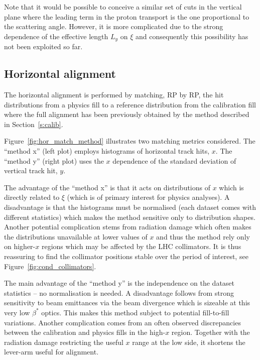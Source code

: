 \documentclass[TOTEM]{cern/cernphprep}
\begin{document}
Note that it would be possible to conceive a similar set of cuts in the vertical plane where the leading term in the proton transport is the one proportional to the scattering angle. However, it is more complicated due to the strong dependence of the effective length $L_y$ on $\xi$ and consequently this possibility has not been exploited so far.

\subsection{Horizontal alignment}
\label{s:phys-horizontal}

The horizontal alignment is performed by matching, RP by RP, the hit distributions from a physics fill to a reference distribution from the calibration fill where the full alignment has been previously obtained by the method described in Section~\ref{s:calib}.

Figure~\ref{fig:hor_match_method} illustrates two matching metrics considered. The ``method x'' (left plot) employs histograms of horizontal track hits, $x$. The ``method y'' (right plot) uses the $x$ dependence of the standard deviation of vertical track hit, $y$.

The advantage of the ``method x'' is that it acts on distributions of $x$ which is directly related to $\xi$ (which is of primary interest for physics analyses). A disadvantage is that the histograms must be normalised (each dataset comes with different statistics) which makes the method sensitive only to distribution shapes. Another potential complication stems from radiation damage which often makes the distributions unavailable at lower values of $x$ and thus the method rely only on higher-$x$ regions which may be affected by the LHC collimators. It is thus reassuring to find the collimator positions stable over the period of interest, see Figure~\ref{fig:cond_collimators}.

The main advantage of the ``method y'' is the independence on the dataset statistics -- no normalisation is needed. A disadvantage follows from strong sensitivity to beam emittances via the beam divergence which is sizeable at this very low $\beta^*$ optics. This makes this method subject to potential fill-to-fill variations. Another complication comes from an often observed discrepancies between the calibration and physics fills in the high-$x$ region. Together with the radiation damage restricting the useful $x$ range at the low side, it shortens the lever-arm useful for alignment.
\end{document}
